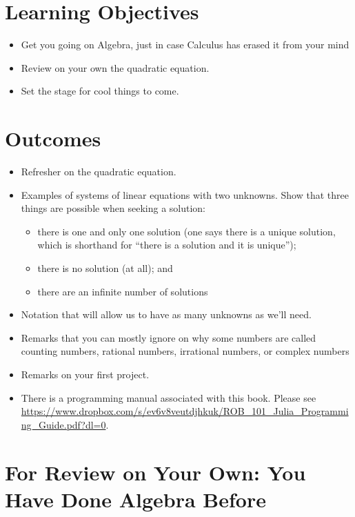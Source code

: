 
\section*{Learning Objectives}

\begin{itemize}
\item Get you going on Algebra, just in case Calculus has erased it from your mind
\item Review on your own the quadratic equation.
\item Set the stage for cool things to come.
\end{itemize}

\section*{Outcomes}
\begin{itemize}
\item Refresher on the quadratic equation.
    \item Examples of systems of linear equations with two unknowns. Show that three things are possible when seeking a solution:
    \begin{itemize}
        \item there is one and only one solution (one says there is a unique solution, which is shorthand for ``there is a solution and it is unique'');
        \item there is no solution (at all); and
        \item there are an infinite number of solutions
    \end{itemize}

    \item Notation that will allow us to have as many unknowns as we'll need.
    \item Remarks that you can mostly ignore on why some numbers are called counting numbers, rational numbers, irrational numbers, or complex numbers
    \item Remarks on your first project.
    
    \item There is a programming manual associated with this book. Please see \url{https://www.dropbox.com/s/ev6v8veutdjhkuk/ROB_101_Julia_Programming_Guide.pdf?dl=0}.
    
\end{itemize}

\newpage

\section{For Review on Your Own: You Have Done Algebra Before}

